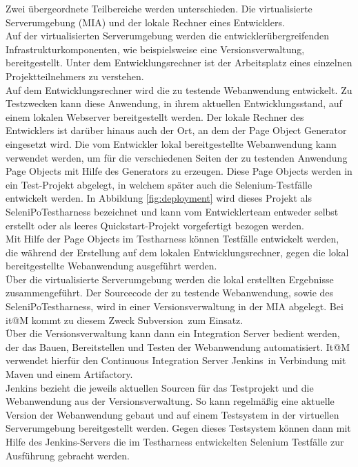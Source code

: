 Zwei übergeordnete Teilbereiche werden unterschieden. Die virtualisierte Serverumgebung (MIA) und der lokale Rechner eines Entwicklers.\\
Auf der virtualisierten Serverumgebung werden die entwicklerübergreifenden Infrastrukturkomponenten, wie beispielsweise eine Versionsverwaltung, bereitgestellt. Unter dem Entwicklungsrechner ist der Arbeitsplatz eines einzelnen Projektteilnehmers zu verstehen.\\
Auf dem Entwicklungsrechner wird die zu testende Webanwendung entwickelt. Zu Testzwecken kann diese Anwendung, in ihrem aktuellen Entwicklungsstand, auf einem lokalen Webserver bereitgestellt werden.
Der lokale Rechner des Entwicklers ist darüber hinaus auch der Ort, an dem der Page Object Generator eingesetzt wird. Die vom Entwickler lokal bereitgestellte Webanwendung kann verwendet werden, um für die verschiedenen Seiten der zu testenden Anwendung Page Objects mit Hilfe des Generators zu erzeugen. Diese Page Objects werden in ein Test-Projekt abgelegt, in welchem später auch die Selenium-Testfälle entwickelt werden. In Abbildung \ref{fig:deployment} wird dieses Projekt als SeleniPoTestharness bezeichnet und kann vom Entwicklerteam entweder selbst erstellt oder als leeres Quickstart-Projekt vorgefertigt bezogen werden.\\ 
Mit Hilfe der Page Objects im Testharness können Testfälle entwickelt werden, die während der Erstellung auf dem lokalen Entwicklungsrechner, gegen die lokal bereitgestellte Webanwendung ausgeführt werden.\\
Über die virtualisierte Serverumgebung werden die lokal erstellten Ergebnisse zusammengeführt. 
Der Sourcecode der zu testende Webanwendung, sowie des SeleniPoTestharness, wird in einer Versionsverwaltung in der MIA abgelegt. Bei it@M kommt zu diesem Zweck \grq Subversion\grq\ zum Einsatz.\\
Über die Versionsverwaltung kann dann ein Integration Server bedient werden, der das Bauen, Bereitstellen und Testen der Webanwendung automatisiert. It@M verwendet hierfür den Continuous Integration Server \grq Jenkins\grq\ in Verbindung mit Maven und einem Artifactory.\\
Jenkins bezieht die jeweils aktuellen Sourcen für das Testprojekt und die Webanwendung aus der Versionsverwaltung. So kann regelmäßig eine aktuelle Version der Webanwendung gebaut und auf einem Testsystem in der virtuellen Serverumgebung bereitgestellt werden. Gegen dieses Testsystem können dann mit Hilfe des Jenkins-Servers die im Testharness entwickelten Selenium Testfälle zur Ausführung gebracht werden.



